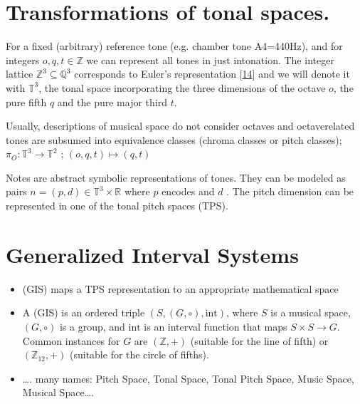 \documentclass[letterpaper,10pt,english]{sphinxmanual}
\begin{document}
\section{Transformations of tonal spaces.}
\label{\detokenize{5_notes:transformations-of-tonal-spaces}}
\sphinxAtStartPar
For a fixed (arbitrary) reference tone (e.g. chamber tone A4=440Hz), and
for integers \(o, q, t \in \mathbb Z\) we can represent all tones in
just intonation. The integer lattice
\(\mathbb Z^3 \subseteq \mathbb Q^3\) corresponds to Euler’s
representation {[}\hyperlink{cite.8_bibliography:id5}{14}{]} and we will denote it with
\(\mathbb T^3\), the tonal space incorporating the three dimensions
of the octave \(o\), the pure fifth \(q\) and the pure major
third \(t\).

\sphinxAtStartPar
Usually, descriptions of musical space do not consider octaves and
octave\sphinxhyphen{}related tones are subsumed into equivalence classes (chroma
classes or pitch classes); \(\pi_O: \mathbb T^3 \to \mathbb T^2\) ;
\((o, q, t) \mapsto (q, t)\)

\sphinxAtStartPar
Notes are abstract symbolic representations of tones. They can be
modeled as pairs \(n=(p, d)\in \mathbb T^3 \times \mathbb R\) where
\(p\) encodes  and \(d\) . The pitch
dimension can be represented in one of the tonal pitch spaces (TPS).


\section{Generalized Interval Systems}
\label{\detokenize{5_notes:generalized-interval-systems}}\begin{itemize}
\item {} 
\sphinxAtStartPar
(GIS) maps a TPS representation to an appropriate mathematical space

\item {} 
\sphinxAtStartPar
A  (GIS) is an ordered triple
\((S, (G, \circ), \text{int})\), where \(S\) is a musical
space, \((G, \circ)\) is a group, and \(\text{int}\) is an
interval function that maps \(S \times S \to G\). Common
instances for \(G\) are \((\mathbb Z, +)\) (suitable for the
line of fifth) or \((\mathbb{Z}_{12}, +)\) (suitable for the
circle of fifths).

\item {} 
\sphinxAtStartPar
…. many names: Pitch Space, Tonal Space, Tonal Pitch Space, Music
Space, Musical Space….

\end{itemize}
\end{document}

